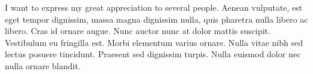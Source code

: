 I want to express my great appreciation to several people.
Aenean vulputate, est eget tempor dignissim, massa magna dignissim nulla, quis
pharetra nulla libero ac libero. Cras id ornare augue. Nunc auctor nunc at dolor
mattis suscipit. Vestibulum eu fringilla est. Morbi elementum varius ornare.
Nulla vitae nibh sed lectus posuere tincidunt. Praesent sed dignissim turpis.
Nulla euismod dolor nec nulla ornare blandit.
